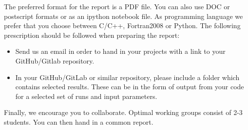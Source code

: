 \documentclass[%
oneside,                 %
final,                   %
10pt]{article}
\begin{document}
The preferred format for the report is a PDF file. You can also use DOC or postscript formats or as an ipython notebook file.  As programming language we prefer that you choose between C/C++, Fortran2008 or Python. The following prescription should be followed when preparing the report:

\begin{itemize}
  \item Send us an email in order  to hand in your projects with a link to your GitHub/Gitlab repository.

  \item In your GitHub/GitLab or similar repository, please include a folder which contains selected results. These can be in the form of output from your code for a selected set of runs and input parameters.
\end{itemize}

\noindent
Finally, 
we encourage you to collaborate. Optimal working groups consist of 
2-3 students. You can then hand in a common report. 



\end{document}
